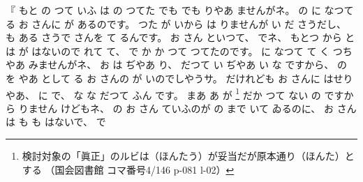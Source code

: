 %
『
もと
の
つて
いふ
は
の
つてた
でも
でも
りやあ
ませんがネ。
%
の
に
なつてる
お
さんに
が
あるのです。
%
つた
が
いから
は
りませんが
い
だ
さうだし、
%
も
ある
さうで
さんを
て
るんです。
%
お
さん
といつて、
%
でネ、
%
もとつ
から
とは
が
はないので
れて
て、
%
で
か
か
つて
つてたのです。
%
に
なつて
て
く
つちやあ
みませんがネ、
%
%
お
は
ぢやあ
り、
%
だつて
い
ぢやあ
い
%
な
ですから、
%
の
を
やあ
として
る
お
さんの
が
いのでしやうサ。
%
だけれども
お
さんに
はせりやあ、
%
に
で、
%
な
な
だつて
ふん
です。
%
まあ
%
あ
が
\footnote{%
検討対象の「眞正」のルビは（ほんたう）が妥当だが原本通り（ほんた）とする
（国会図書館 コマ番号4/146 p-081 l-02）
}%
だか%
つて
ない
の
ですから
りません
けどもネ、
%
の
お
さん
ていふのが
の
まで
いて
ゐるのに、
%
お
さんは
も
も
はないで、
%
で%

